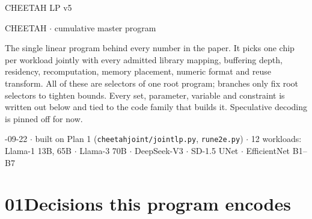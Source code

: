 \documentclass[10pt]{article}
\renewcommand{\_}{\textunderscore\allowbreak}
\begin{document}
 CHEETAH LP v5           

{\small\sffamily\color{accent} CHEETAH $\cdot$ cumulative master program}


The single linear program behind every number in the paper. It picks one chip per workload jointly with every admitted library mapping, buffering depth, residency, recomputation, memory placement, numeric format and reuse transform. All of these are selectors of one root program; branches only fix root selectors to tighten bounds. Every set, parameter, variable and constraint is written out below and tied to the code family that builds it. Speculative decoding is pinned off for now.

 

{\small{}-09-22 $\cdot$ built on Plan 1 (\texttt{cheetah\_joint/joint\_lp.py}, \texttt{run\_e2e.py}) $\cdot$ 12 workloads: Llama-1 13B, 65B $\cdot$ Llama-3 70B $\cdot$ DeepSeek-V3 $\cdot$ SD-1.5 UNet $\cdot$ EfficientNet B1--B7}

   
\section*{01\quad Decisions this program encodes}
 
\end{document}
